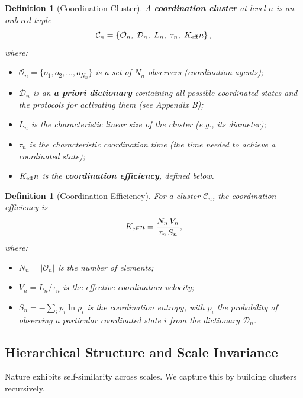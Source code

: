 \documentclass[12pt,a4paper]{article}
\newtheorem{definition}[theorem]{Definition}
\newcommand{\Keff}[1][]{K_{\mathrm{eff}\if\relax\detokenize{#1}\relax\else,#1\fi}}   %
\newcommand{\cC}{\mathcal{C}}
\begin{document}
	\begin{definition}[Coordination Cluster]
		A \textbf{coordination cluster} at level $n$ is an ordered tuple
		\begin{equation}
			\cC_n = \left\{ \mathcal{O}_n,\; \mathcal{D}_n,\; L_n,\; \tau_n,\; \Keff{n} \right\},
		\end{equation}
		where:
		\begin{itemize}
			\item $\mathcal{O}_n = \{o_1,o_2,\dots,o_{N_n}\}$ is a set of $N_n$ observers (coordination agents);
			\item $\mathcal{D}_n$ is an \textbf{a priori dictionary} containing all possible coordinated states and the protocols for activating them (see Appendix B);
			\item $L_n$ is the characteristic linear size of the cluster (e.g., its diameter);
			\item $\tau_n$ is the characteristic coordination time (the time needed to achieve a coordinated state);
			\item $\Keff{n}$ is the \textbf{coordination efficiency}, defined below.
		\end{itemize}
	\end{definition}
	
	\begin{definition}[Coordination Efficiency]
		For a cluster $\cC_n$, the coordination efficiency is
		\begin{equation}
			\Keff{n} = \frac{N_n \, V_n}{\tau_n \, S_n},
			\label{eq:keff-def}
		\end{equation}
		where:
		\begin{itemize}
			\item $N_n = |\mathcal{O}_n|$ is the number of elements;
			\item $V_n = L_n/\tau_n$ is the effective coordination velocity;
			\item $S_n = -\sum_i p_i \ln p_i$ is the coordination entropy, with $p_i$ the probability of observing a particular coordinated state $i$ from the dictionary $\mathcal{D}_n$.
		\end{itemize}
	\end{definition}
	
	\subsection{Hierarchical Structure and Scale Invariance}
	
	Nature exhibits self-similarity across scales. We capture this by building clusters recursively.
	
\end{document}
